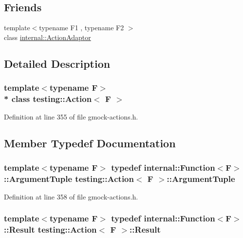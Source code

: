\subsection*{Friends}
\begin{DoxyCompactItemize}
\item 
{\footnotesize template$<$typename F1 , typename F2 $>$ }\\class \hyperlink{classtesting_1_1_action_a66fe4f9c9b9d020273151aa6054b491e}{internal\+::\+Action\+Adaptor}
\end{DoxyCompactItemize}


\subsection{Detailed Description}
\subsubsection*{template$<$typename F$>$\\*
class testing\+::\+Action$<$ F $>$}



Definition at line 355 of file gmock-\/actions.\+h.



\subsection{Member Typedef Documentation}
\subsubsection[{\texorpdfstring{Argument\+Tuple}{ArgumentTuple}}]{\setlength{\rightskip}{0pt plus 5cm}template$<$typename F$>$ typedef {\bf internal\+::\+Function}$<$F$>$\+::{\bf Argument\+Tuple} {\bf testing\+::\+Action}$<$ F $>$\+::{\bf Argument\+Tuple}}\hypertarget{classtesting_1_1_action_ae27fda510696a9294f991de5b1abfaf2}{}\label{classtesting_1_1_action_ae27fda510696a9294f991de5b1abfaf2}


Definition at line 358 of file gmock-\/actions.\+h.

\subsubsection[{\texorpdfstring{Result}{Result}}]{\setlength{\rightskip}{0pt plus 5cm}template$<$typename F$>$ typedef {\bf internal\+::\+Function}$<$F$>$\+::{\bf Result} {\bf testing\+::\+Action}$<$ F $>$\+::{\bf Result}}\hypertarget{classtesting_1_1_action_a9af08a21ad329331fde856cba9b6dea2}{}\label{classtesting_1_1_action_a9af08a21ad329331fde856cba9b6dea2}


